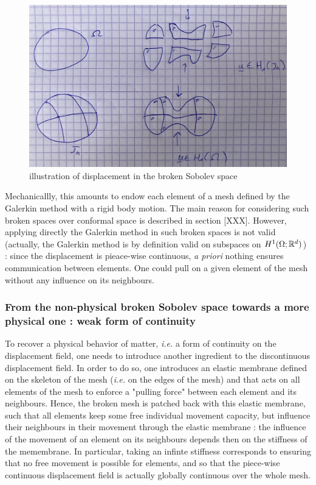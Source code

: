 \documentclass[fleqn]{article}
\begin{document}
            \begin{figure}[h]
                \centering
                \includegraphics[width=10.cm]{img/broken_space1.png}
                \caption{illustration of displacement in the broken Sobolev space}
                \label{fig_broken_sapce}
            \end{figure}

            Mechanicallly, this amounts to endow each element of a mesh defined by the Galerkin method with a rigid body motion. The main reason for considering such broken spaces over conformal space is described in section [XXX]. However, applying directly the Galerkin method in such broken spaces is not valid (actually, the Galerkin method is by definition valid on subspaces on $H^{1}(\Omega; \mathbb{R}^{d})$) : since the displacement is pieace-wise continuous, \textit{a priori} nothing ensures communication between elements. One could pull on a given element of the mesh without any influence on its neighbours.

            \subsubsection{From the non-physical broken Sobolev space towards a more physical one : weak form of continuity}

            To recover a physical behavior of matter, \textit{i.e.} a form of continuity on the displacement field, one needs to introduce another ingredient to the discontinuous displacement field. In order to do so, one introduces an elastic membrane defined on the skeleton of the mesh (\textit{i.e.} on the edges of the mesh) and that acts on all elements of the mesh to enforce a "pulling force" between each element and its neighbours. Hence, the broken mesh is patched back with this elastic membrane, such that all elements keep some free individual movement capacity, but influence their neighbours in their movement through the elastic membrane : the influence of the movement of an element on its neighbours depends then on the stiffness of the memembrane. In particular, taking an infinte stiffness corresponds to ensuring that no free movement is possible for elements, and so that the piece-wise continuous displacement field is actually globally continuous over the whole mesh.
\end{document}
